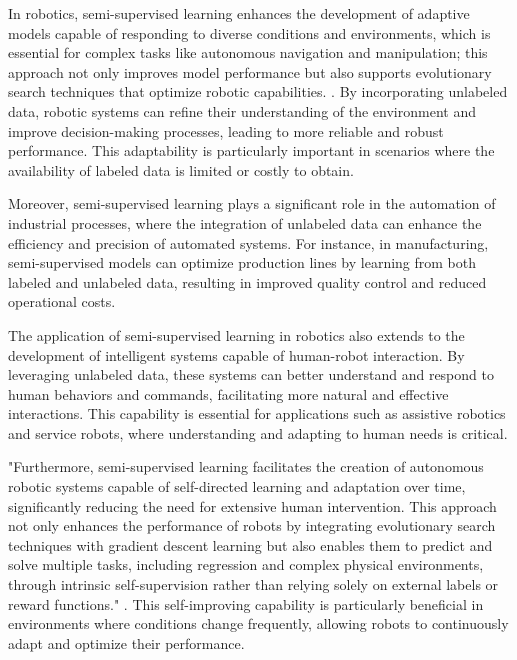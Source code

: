 In robotics, semi-supervised learning enhances the development of adaptive models capable of responding to diverse conditions and environments, which is essential for complex tasks like autonomous navigation and manipulation; this approach not only improves model performance but also supports evolutionary search techniques that optimize robotic capabilities. \cite{le2019evolvingselfsupervisedneuralnetworks}. By incorporating unlabeled data, robotic systems can refine their understanding of the environment and improve decision-making processes, leading to more reliable and robust performance. This adaptability is particularly important in scenarios where the availability of labeled data is limited or costly to obtain.



Moreover, semi-supervised learning plays a significant role in the automation of industrial processes, where the integration of unlabeled data can enhance the efficiency and precision of automated systems. For instance, in manufacturing, semi-supervised models can optimize production lines by learning from both labeled and unlabeled data, resulting in improved quality control and reduced operational costs.



The application of semi-supervised learning in robotics also extends to the development of intelligent systems capable of human-robot interaction. By leveraging unlabeled data, these systems can better understand and respond to human behaviors and commands, facilitating more natural and effective interactions. This capability is essential for applications such as assistive robotics and service robots, where understanding and adapting to human needs is critical.



"Furthermore, semi-supervised learning facilitates the creation of autonomous robotic systems capable of self-directed learning and adaptation over time, significantly reducing the need for extensive human intervention. This approach not only enhances the performance of robots by integrating evolutionary search techniques with gradient descent learning but also enables them to predict and solve multiple tasks, including regression and complex physical environments, through intrinsic self-supervision rather than relying solely on external labels or reward functions." \cite{le2019evolvingselfsupervisedneuralnetworks}. This self-improving capability is particularly beneficial in environments where conditions change frequently, allowing robots to continuously adapt and optimize their performance.



